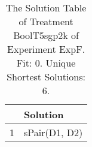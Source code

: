 \begin{table}[ht]
\centering
\begin{tabular}{rp{9cm}}
  \hline
 & Solution \\ 
  \hline
1 & sPair(D1, D2) \\ 
   \hline
\end{tabular}
\caption{The Solution Table of Treatment BoolT5sgp2k of Experiment ExpF. Fit: 0. Unique Shortest Solutions: 6.} 
\end{table}
